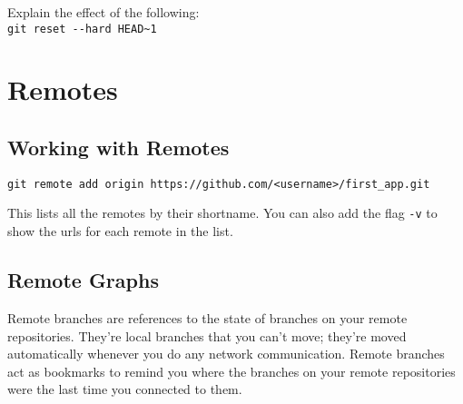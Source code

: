 \frmrule 

\begin{example}
Explain the effect of the following: \\
\lstinline{git reset --hard HEAD~1}
\end{example}


\chapter{Remotes}

\section{Working with Remotes}


\frmrule 

\begin{example}
  \lstinline{git remote add origin https://github.com/<username>/first_app.git}
\end{example}

\frmrule

This lists all the remotes by their shortname. 
You can also add the flag \lstinline{-v} to show the urls for each 
remote in the list. 

\frmrule 


\frmrule 

\section{Remote Graphs}

Remote branches are references to the state of branches on your remote repositories.
They’re local branches that you can’t move; they’re moved automatically whenever you do
any network communication. Remote branches act as bookmarks to remind you where the
branches on your remote repositories were the last time you connected to them.





